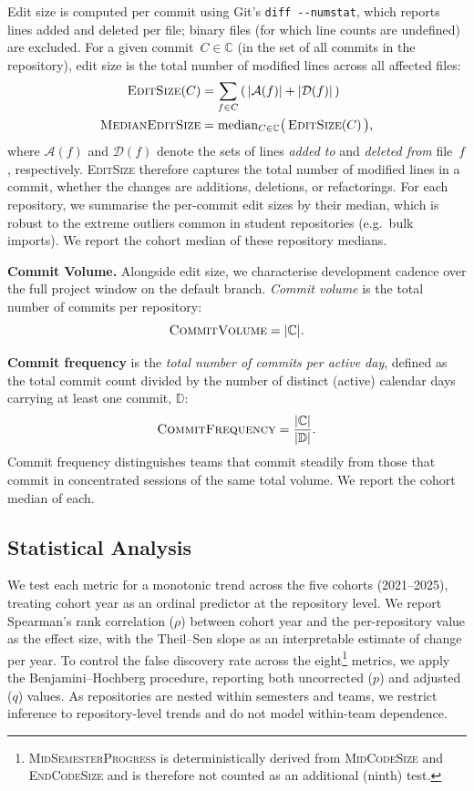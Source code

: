 \documentclass[sigconf,authorversion]{acmart}
\begin{document}
Edit size is computed per commit using Git's \texttt{diff -{}-numstat}, which reports lines added and deleted per file; binary files (for which line counts are undefined) are excluded. For a given commit~$C \in \mathbb{C}$ (in the set of all commits in the repository), edit size is the total number of modified lines across all affected files:
%
\begin{align*}
\textsc{EditSize}(C)
&=
\sum_{f \in C}
\left(\,
|\mathcal{A}(f)| + |\mathcal{D}(f)|
\,\right)
\\
\textsc{MedianEditSize}
&=
\operatorname{median}_{C \in \mathbb{C}}
\bigl(\,\textsc{EditSize}(C)\,\bigr),
\end{align*}
%
where $\mathcal{A}(f)$ and $\mathcal{D}(f)$ denote the sets of lines \emph{added to} and 
\emph{deleted from} file~$f$, respectively. \textsc{EditSize} therefore captures the total number of modified lines in a commit, whether the changes are additions, deletions, or refactorings.
For each repository, we summarise the per-commit edit sizes by their median, which is robust to the extreme outliers common in student repositories (e.g.\ bulk imports). We report the cohort median of these repository medians.

\textbf{Commit Volume.}
\label{sec:commits}
Alongside edit size, we characterise development cadence over the full project window on the default branch. \emph{Commit volume} is the total number of commits per repository:
\[
\textsc{CommitVolume} = |\mathbb{C}|.
\]
%

\textbf{Commit frequency} is the \emph{total number of commits per active day}, defined as the total commit count divided by the number of distinct (active) calendar days carrying at least one commit, $\mathbb{D}$:
%
\[
\textsc{CommitFrequency}
=
\frac{|\mathbb{C}|}
     {|\mathbb{D}|}.
\]
%
Commit frequency distinguishes teams that commit steadily from those that commit in concentrated sessions of the same total volume. We report the cohort median of each.


\subsection{Statistical Analysis}
\label{sec:stats}
We test each metric for a monotonic trend across the five cohorts (2021--2025), treating cohort year as an ordinal predictor at the repository level. We report Spearman's rank correlation ($\rho$) between cohort year and the per-repository value as the effect size, with the Theil--Sen slope as an interpretable estimate of change per year. To control the false discovery rate across the eight\footnote{\textsc{MidSemesterProgress} is deterministically derived from \textsc{MidCodeSize} and \textsc{EndCodeSize} and is therefore not counted as an additional (ninth) test.} metrics, we apply the Benjamini--Hochberg procedure, reporting both uncorrected ($p$) and adjusted ($q$) values. As repositories are nested within semesters and
teams, we restrict inference to repository-level trends and do not model within-team dependence.
\end{document}
